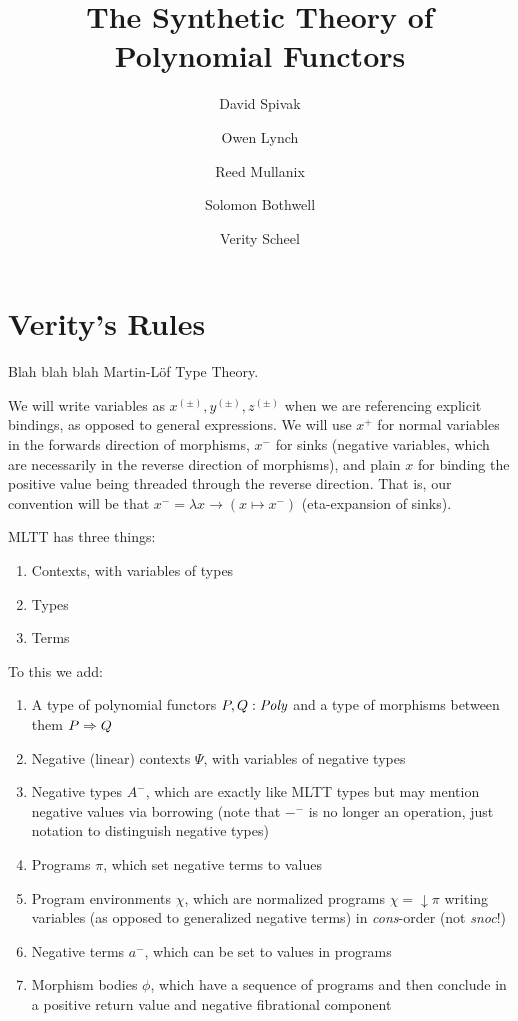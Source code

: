 \documentclass[final]{amsart}
\title{The Synthetic Theory of Polynomial Functors}
\author{David Spivak}
\author{Owen Lynch}
\author{Reed Mullanix}
\author{Solomon Bothwell}
\author{Verity Scheel}
\begin{document}
\maketitle

\section{Verity's Rules}

Blah blah blah Martin-L\"of Type Theory.

We will write variables as $x^{(\pm)}, y^{(\pm)}, z^{(\pm)}$ when we are referencing explicit bindings, as opposed to general expressions.
We will use $x^{+}$ for normal variables in the forwards direction of morphisms, $x^{-}$ for sinks (negative variables, which are necessarily in the reverse direction of morphisms), and plain $x$ for binding the positive value being threaded through the reverse direction.
That is, our convention will be that $x^{-} = \lambda x \to (x \mapsto x^{-})$ (eta-expansion of sinks).

MLTT has three things:
\begin{enumerate}
  \item Contexts, with variables of types
  \item Types
  \item Terms
\end{enumerate}

To this we add:
\begin{enumerate}
  \item A type of polynomial functors $P, Q : \mathit{Poly}$ and a type of morphisms between them $P \Rightarrow Q$
  \item Negative (linear) contexts $\Psi$, with variables of negative types
  \item Negative types $A^{-}$, which are exactly like MLTT types but may mention negative values via borrowing (note that ${-}^{-}$ is no longer an operation, just notation to distinguish negative types)
  \item Programs $\pi$, which set negative terms to values
  \item Program environments $\chi$, which are normalized programs $\chi = {\downarrow \pi}$ writing variables (as opposed to generalized negative terms) in \emph{cons}-order (not \emph{snoc}!)
  \item Negative terms $a^{-}$, which can be set to values in programs
  \item Morphism bodies $\phi$, which have a sequence of programs and then conclude in a positive return value and negative fibrational component
\end{enumerate}
\end{document}
